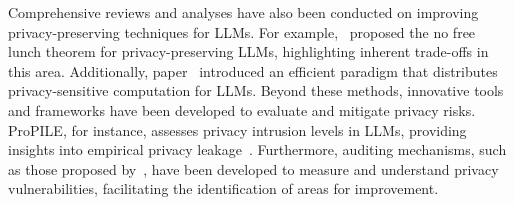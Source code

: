 Comprehensive reviews and analyses have also been conducted on improving privacy-preserving techniques for LLMs. For example,~\cite{Zhang2024NoFL} proposed the no free lunch theorem for privacy-preserving LLMs, highlighting inherent trade-offs in this area. Additionally, paper~\cite{Wang2023PrivateLoRAFE} introduced an efficient paradigm that distributes privacy-sensitive computation for LLMs. Beyond these methods, innovative tools and frameworks have been developed to evaluate and mitigate privacy risks. ProPILE, for instance, assesses privacy intrusion levels in LLMs, providing insights into empirical privacy leakage~\cite{Kim2023ProPILEPP}. Furthermore, auditing mechanisms, such as those proposed by~\cite{Kazmi2024PANORAMIAPA}, have been developed to measure and understand privacy vulnerabilities, facilitating the identification of areas for improvement.




